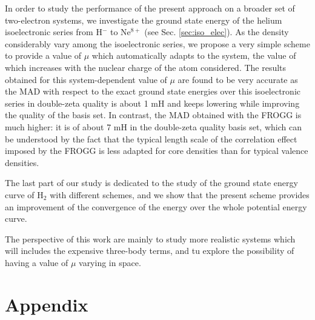 \documentclass[aip,jcp,reprint,noshowkeys,superscriptaddress]{revtex4-1}
\begin{document}
In order to study the performance of the present approach on a broader set of two-electron systems, we investigate the ground state energy of the helium isoelectronic series from H$^-$ to Ne$^{8+}$ (see Sec. \ref{sec:iso_elec}). 
As the density considerably vary among the isoelectronic series, we propose a very simple scheme to provide a value of $\mu$ which automatically adapts to the system, the value of which increases with the nuclear charge of the atom considered. The results obtained for this system-dependent value of $\mu$ are found to be very accurate as the MAD with respect to the exact ground state energies over this isoelectronic series in double-zeta quality is about 1 mH and keeps lowering while improving the quality of the basis set. In contrast, the MAD obtained with the FROGG is much higher: it is of about 7 mH in the double-zeta quality basis set, which can be understood by the fact that the typical length scale of the correlation effect imposed by the FROGG is less adapted for core densities than for typical valence densities.  

The last part of our study is dedicated to the study of the ground state energy curve of H$_2$ with different schemes, and we show that the present scheme provides an improvement of the convergence of the energy over the whole potential energy curve. 

The perspective of this work are mainly to study more realistic systems which will includes the expensive three-body terms, and tu explore the possibility of having a value of $\mu$ varying in space. 


\section{Appendix}
\end{document}
